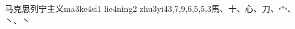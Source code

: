 \begin{EntryWithPhonetic}{马克思列宁主义}{ma3ke4si1 lie4ning2 zhu3yi4}{3,7,9,6,5,5,3}{⾺、⼗、⼼、⼑、⼧、⼂、⼂}
\end{EntryWithPhonetic}

